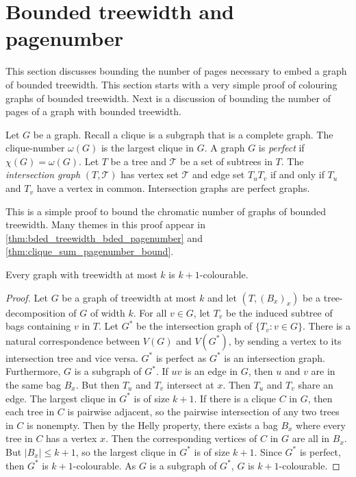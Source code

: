 
\section{Bounded treewidth and pagenumber}\label{sec:Bounded_Treewidth}

This section discusses bounding the number of pages necessary to embed a graph of bounded treewidth. This section starts with a very simple proof of colouring graphs of bounded treewidth. Next is a discussion of bounding the number of pages of a graph with bounded treewidth.

Let $G$ be a graph. Recall a clique is a subgraph that is a complete graph. The clique-number $\omega(G)$ is the largest clique in $G$. A graph $G$ is \textit{perfect} if $\chi(G) = \omega(G)$. Let $T$ be a tree and $\mathcal{T}$ be a set of subtrees in $T$. The \textit{intersection graph} $(T, \mathcal{T})$ has vertex set $\mathcal{T}$ and edge set $T_u T_v$ if and only if $T_u$ and $T_v$ have a vertex in common. Intersection graphs are perfect graphs. 

This is a simple proof to bound the chromatic number of graphs of bounded treewidth. Many themes in this proof appear in \cref{thm:bded_treewidth_bded_pagenumber} and \cref{thm:clique_sum_pagenumber_bound}. 
\begin{theorem}
	Every graph with treewidth at most $k$ is $k + 1$-colourable.
\end{theorem}

\begin{proof}
	Let $G$ be a graph of treewidth at most $k$ and let $(T, {(B_x)}_x)$ be a tree-decomposition of $G$ of width $k$. For all $v \in G$, let $T_v$ be the induced subtree of bags containing $v$ in $T$. Let $G^*$ be the intersection graph of $\{T_v : v \in G\}$. There is a natural correspondence between $V(G)$ and $V(G^*)$, by sending a vertex to its intersection tree and vice versa. $G^*$ is perfect as $G^*$ is an intersection graph. Furthermore, $G$ is a subgraph of $G^*$. If $uv$ is an edge in $G$, then $u$ and $v$ are in the same bag $B_x$. But then $T_u$ and $T_v$ intersect at $x$. Then $T_u$ and $T_v$ share an edge. The largest clique in $G^*$ is of size $k + 1$. If there is a clique $C$ in $G$, then each tree in $C$ is pairwise adjacent, so the pairwise intersection of any two trees in $C$ is nonempty. Then by the Helly property, there exists a bag $B_x$ where every tree in $C$ has a vertex $x$. Then the corresponding vertices of $C$ in $G$ are all in $B_x$. But $|B_x| \leq k + 1$, so the largest clique in $G^*$ is of size $k + 1$. Since $G^*$ is perfect, then $G^*$ is $k + 1$-colourable. As $G$ is a subgraph of $G^*$, $G$ is $k + 1$-colourable. 
\end{proof}

